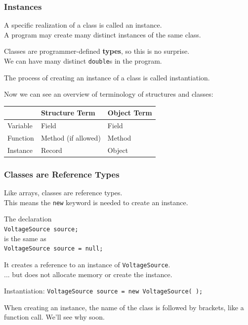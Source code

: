 \begin{frame}
\frametitle{Instances}

A specific realization of a class is called an \alert{instance}.\\
\quad A program may create many distinct instances of the same class.

Classes are programmer-defined \textbf{types}, so this is no surprise.\\
\quad We can have many distinct \texttt{double}s in the program.

The process of creating an instance of a class is called \alert{instantiation}.

Now we can see an overview of terminology of structures and classes:

\begin{center}
\begin{tabular}{l|l|l}
      & \textbf{Structure Term} & \textbf{Object Term} \\ \hline
	Variable & Field & Field \\ \hline
	Function & Method (if allowed) & Method \\ \hline
	Instance & Record & Object \\
\end{tabular}
\end{center}


\end{frame}

\begin{frame}
\frametitle{Classes are Reference Types}
Like arrays, classes are reference types. \\
\quad This means the \texttt{new} keyword is needed to create an instance.

The declaration\\
\quad \texttt{VoltageSource source;}\\
 is the same as\\
\quad  \texttt{VoltageSource source = null;}

  
It creates a reference to  an instance of \texttt{VoltageSource}.\\
\quad ... but does not allocate memory or create the instance.

Instantiation: \texttt{VoltageSource source = new VoltageSource( );}

When creating an instance, the name of the class is followed by brackets, like a function call. We'll see why soon.

\end{frame}

